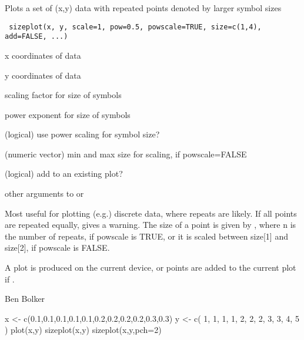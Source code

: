 \begin{Description}\relax
Plots a set of (x,y) data with repeated points denoted by larger
symbol sizes
\end{Description}
\begin{Usage}
\begin{verbatim}
 sizeplot(x, y, scale=1, pow=0.5, powscale=TRUE, size=c(1,4), add=FALSE, ...)
\end{verbatim}
\end{Usage}
\begin{Arguments}
\begin{ldescription}
\item[\code{x}] x coordinates of data
\item[\code{y}] y coordinates of data
\item[\code{scale}] scaling factor for size of symbols
\item[\code{pow}] power exponent for size of symbols
\item[\code{powscale}] (logical) use power scaling for symbol size?
\item[\code{size}] (numeric vector) min and max size for scaling, if powscale=FALSE
\item[\code{add}] (logical) add to an existing plot?
\item[\code{...}] other arguments to  or 
\end{ldescription}
\end{Arguments}
\begin{Details}\relax
Most useful for plotting (e.g.) discrete data, where repeats are
likely.  If all points are repeated equally, gives a warning.  The
size of a point is given by , where n is the number of
repeats, if powscale is TRUE, or it is scaled between size[1] and size[2],
if powscale is FALSE.
\end{Details}
\begin{Value}
A plot is produced on the current device, or points are added to the
current plot if .
\end{Value}
\begin{Author}\relax
Ben Bolker
\end{Author}
\begin{SeeAlso}\relax
{}
\end{SeeAlso}
\begin{Examples}
\begin{ExampleCode}
 x <- c(0.1,0.1,0.1,0.1,0.1,0.2,0.2,0.2,0.2,0.3,0.3)
 y <- c( 1,  1,  1,  1,  2,  2,  2,  3,  3,  4,  5 )
 plot(x,y)
 sizeplot(x,y)
 sizeplot(x,y,pch=2)
\end{ExampleCode}
\end{Examples}

